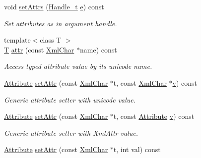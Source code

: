 \begin{DoxyCompactItemize}
void \hyperlink{class_d_d4hep_1_1_x_m_l_1_1_handle__t_a67f2b7a7099f5cbc5847ae1852a2dfd6}{set\+Attrs} (\hyperlink{class_d_d4hep_1_1_x_m_l_1_1_handle__t}{Handle\+\_\+t} \hyperlink{_volumes_8cpp_a8a9a1f93e9b09afccaec215310e64142}{e}) const
\begin{DoxyCompactList}\small\item\em Set attributes as in argument handle. \end{DoxyCompactList}\item 
{\footnotesize template$<$class T $>$ }\\\hyperlink{class_t}{T} \hyperlink{class_d_d4hep_1_1_x_m_l_1_1_handle__t_a252b09f45c91a31ca33fe0f858ef4121}{attr} (const \hyperlink{namespace_d_d4hep_1_1_x_m_l_a09e5d9cc86ed782f6826dfe0778c1815}{Xml\+Char} $\ast$name) const
\begin{DoxyCompactList}\small\item\em Access typed attribute value by it\textquotesingle{}s unicode name. \end{DoxyCompactList}\item 
\hyperlink{namespace_d_d4hep_1_1_x_m_l_a5c19b7116be99d69b4b22d911357baaf}{Attribute} \hyperlink{class_d_d4hep_1_1_x_m_l_1_1_handle__t_a632cbc35565d20727b74d340ea637893}{set\+Attr} (const \hyperlink{namespace_d_d4hep_1_1_x_m_l_a09e5d9cc86ed782f6826dfe0778c1815}{Xml\+Char} $\ast$t, const \hyperlink{namespace_d_d4hep_1_1_x_m_l_a09e5d9cc86ed782f6826dfe0778c1815}{Xml\+Char} $\ast$\hyperlink{_multi_view_8cpp_a8320ee13ac034dbf6d624fe8953dd337}{v}) const
\begin{DoxyCompactList}\small\item\em Generic attribute setter with unicode value. \end{DoxyCompactList}\item 
\hyperlink{namespace_d_d4hep_1_1_x_m_l_a5c19b7116be99d69b4b22d911357baaf}{Attribute} \hyperlink{class_d_d4hep_1_1_x_m_l_1_1_handle__t_ad4a21b74eff73c7b4b0d7eb068835ee4}{set\+Attr} (const \hyperlink{namespace_d_d4hep_1_1_x_m_l_a09e5d9cc86ed782f6826dfe0778c1815}{Xml\+Char} $\ast$t, const \hyperlink{namespace_d_d4hep_1_1_x_m_l_a5c19b7116be99d69b4b22d911357baaf}{Attribute} \hyperlink{_multi_view_8cpp_a8320ee13ac034dbf6d624fe8953dd337}{v}) const
\begin{DoxyCompactList}\small\item\em Generic attribute setter with Xml\+Attr value. \end{DoxyCompactList}\item 
\hyperlink{namespace_d_d4hep_1_1_x_m_l_a5c19b7116be99d69b4b22d911357baaf}{Attribute} \hyperlink{class_d_d4hep_1_1_x_m_l_1_1_handle__t_abe759dd5af5ba95d05a0d4ed06f5bd9b}{set\+Attr} (const \hyperlink{namespace_d_d4hep_1_1_x_m_l_a09e5d9cc86ed782f6826dfe0778c1815}{Xml\+Char} $\ast$t, int val) const

\end{DoxyCompactItemize}
